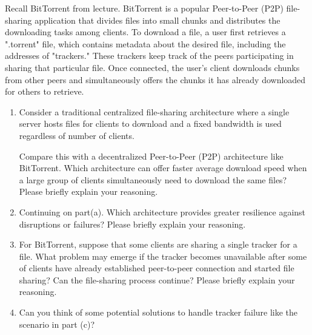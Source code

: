 \documentclass{report}
\begin{document}
\newpage

\begin{problem}
Recall BitTorrent from lecture. BitTorrent is a popular Peer-to-Peer (P2P) file-sharing application that divides files into small chunks and distributes the downloading tasks among clients. To download a file, a user first retrieves a ".torrent" file, which contains metadata about the desired file, including the addresses of "trackers." These trackers keep track of the peers participating in sharing that particular file. Once connected, the user's client downloads chunks from other peers and simultaneously offers the chunks it has already downloaded for others to retrieve.

\begin{enumerate}
\item Consider a traditional centralized file-sharing architecture where a single server hosts files for clients to download and a fixed bandwidth is used regardless of number of clients. 

Compare this with a decentralized Peer-to-Peer (P2P) architecture like BitTorrent. Which architecture can offer faster average download speed when a large group of clients simultaneously need to download the same files? Please briefly explain your reasoning.
\item Continuing on part(a). Which architecture provides greater resilience against disruptions or failures? Please briefly explain your reasoning.
\item For BitTorrent, suppose that some clients are sharing a single tracker for a file. What problem may emerge if the tracker becomes unavailable after some of clients have already established peer-to-peer connection and started file sharing? Can the file-sharing process continue? Please briefly explain your reasoning.
\item Can you think of some potential solutions to handle tracker failure like the scenario in part (c)?

\end{enumerate}


\medskip


\end{problem}
\end{document}
